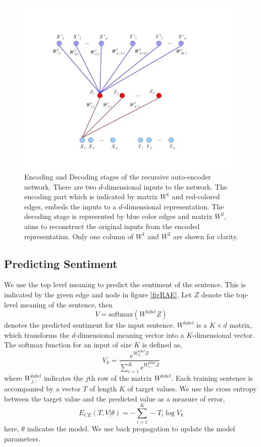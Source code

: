 \documentclass[twoside,12pt]{article}
\begin{document}
\begin{figure}[ht!]
\centering
\includegraphics[width=.8\textwidth]{autoencoder.pdf}
\caption{Encoding and Decoding stages of the recursive auto-encoder network. There are two $d$-dimensional inputs to the network. The encoding part which is indicated by matrix $W^1$ and red-colored edges,  embeds the inputs to a $d$-dimensional representation. The decoding stage is represented by blue color edges and matrix $W^2$, aims to reconstruct the original inputs from the encoded representation. Only one column of $W^1$ and $W^2$ are shown for clarity.}
\label{figEncodingDecoding}
\end{figure}


\subsection{Predicting Sentiment}
We use the top level meaning to predict the sentiment of the sentence. This is indicated by the green edge and node in figure \ref{figRAE}. Let $Z$ denote the top-level meaning of the sentence, then
\begin{equation}
V = \text{softmax}(W^{label} Z)
\end{equation}
denotes the predicted sentiment for the input sentence. $W^{label}$ is a $K\times d$ matrix, which transforms the $d$-dimensional meaning vector into a $K$-dimensional vector. The softmax function for an input of size $K$ is defined as,
\begin{equation}
V_k = \frac{e^{W^{label}_{k,:}Z}}{\sum_{i=1}^K e^{W^{label}_{i,:}Z}}
\end{equation}
where $W^{label}_{j,:}$ indicates the $j$th row of the matrix $W^{label}$. Each training sentence is accompanied by a vector $T$ of length $K$ of target values. We use the cross entropy between the target value and the predicted value as a measure of error,
\begin{equation}
E_{CE} (T,V|\theta) = -\sum_{i=1}^K -T_i \log V_k
\label{eqCEErr}
\end{equation}
here, $\theta$ indicates the model. We use back propagation to update the model parameters.
\end{document}
